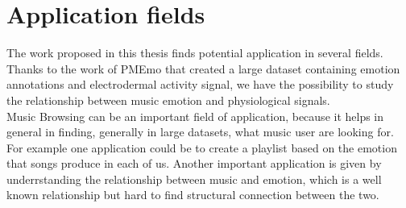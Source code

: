 \section{Application fields}
\indent
The work proposed in this thesis finds potential application in several fields. Thanks to the work of PMEmo that created a large dataset containing emotion annotations and electrodermal activity signal, we have the possibility to study the relationship between music emotion and physiological signals.
\\
Music Browsing can be an important field of application, because it helps in general in finding, generally in large datasets, what music user are looking for. For example one application could be to create a playlist based on the emotion that songs produce in each of us.
Another important application is given by underrstanding the relationship between music and emotion, which is a well known relationship but hard to find structural connection between the two.




